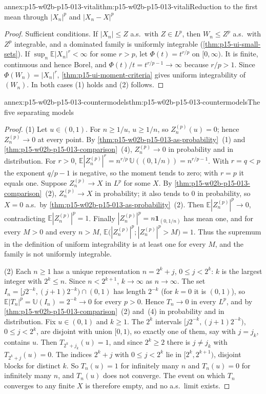\begin{annexitem}{annex:p15-w02b-p15-013-vitali}{thm:p15-w02b-p15-013-vitali}{Reduction to the first mean through \(|X_n|^p\) and \(|X_n-X|^p\)}
\begin{proof}
Sufficient conditions. If \(|X_n|\leq Z\) a.s.\ with \(Z\in L^p\),
then \(W_n\leq Z^p\) a.s.\ with \(Z^p\) integrable, and a dominated
family is uniformly integrable (\cref{thm:p15-ui-small-sets}). If
\(\sup_n\mathbb E|X_n|^r<\infty\) for some \(r>p\), let
\(\Phi(t)=t^{r/p}\) on \([0,\infty)\). It is finite, continuous and
hence Borel, and \(\Phi(t)/t=t^{r/p-1}\to\infty\) because \(r/p>1\).
Since \(\Phi(W_n)=|X_n|^r\), \cref{thm:p15-ui-moment-criteria} gives
uniform integrability of \((W_n)\). In both cases (1) holds and (2)
follows.
\end{proof}
\end{annexitem}

\begin{annexitem}{annex:p15-w02b-p15-013-countermodels}{thm:p15-w02b-p15-013-countermodels}{The five separating models}
\begin{proof}
(1) Let \(u\in(0,1)\). For \(n\geq1/u\), \(u\geq1/n\), so
\(Z^{(p)}_n(u)=0\); hence \(Z^{(p)}_n\to0\) at every point. By
\cref{thm:p15-w02b-p15-013-as-probability}~(1) and
\cref{thm:p15-w02b-p15-013-comparison}~(4), \(Z^{(p)}_n\to0\) in
probability and in distribution. For \(r>0\),
\(\mathbb E|Z^{(p)}_n|^r=n^{r/p}\,\mathbb U((0,1/n))=n^{r/p-1}\).
With \(r=q<p\) the exponent \(q/p-1\) is negative, so the moment tends
to zero; with \(r=p\) it equals one. Suppose \(Z^{(p)}_n\to X\) in
\(L^p\) for some \(X\). By
\cref{thm:p15-w02b-p15-013-comparison}~(2), \(Z^{(p)}_n\to X\) in
probability; it also tends to \(0\) in probability, so \(X=0\) a.s.\
by \cref{thm:p15-w02b-p15-013-as-probability}~(2). Then
\(\mathbb E|Z^{(p)}_n|^p\to0\), contradicting
\(\mathbb E|Z^{(p)}_n|^p=1\). Finally
\(|Z^{(p)}_n|^p=n\mathbf1_{(0,1/n)}\) has mean one, and for every
\(M>0\) and every \(n>M\),
\(\mathbb E\bigl(|Z^{(p)}_n|^p;|Z^{(p)}_n|^p>M\bigr)=1\). Thus the
supremum in the definition of uniform integrability is at least one
for every \(M\), and the family is not uniformly integrable.

(2) Each \(n\geq1\) has a unique representation \(n=2^k+j\),
\(0\leq j<2^k\): \(k\) is the largest integer with \(2^k\leq n\). Since
\(n<2^{k+1}\), \(k\to\infty\) as \(n\to\infty\). The set
\(I_n=[j2^{-k},(j+1)2^{-k})\cap(0,1)\) has length \(2^{-k}\) (for
\(k=0\) it is \((0,1)\)), so
\(\mathbb E|T_n|^p=\mathbb U(I_n)=2^{-k}\to0\) for every \(p>0\).
Hence \(T_n\to0\) in every \(L^p\), and by
\cref{thm:p15-w02b-p15-013-comparison}~(2) and~(4) in probability and
in distribution. Fix \(u\in(0,1)\) and \(k\geq1\). The \(2^k\) intervals
\([j2^{-k},(j+1)2^{-k})\), \(0\leq j<2^k\), are disjoint with union
\([0,1)\), so exactly one of them, say with \(j=j_k\), contains \(u\).
Then \(T_{2^k+j_k}(u)=1\), and since \(2^k\geq2\) there is
\(j\neq j_k\) with \(T_{2^k+j}(u)=0\). The indices \(2^k+j\) with
\(0\leq j<2^k\) lie in \([2^k,2^{k+1})\), disjoint blocks for distinct
\(k\). So \(T_n(u)=1\) for infinitely many \(n\) and \(T_n(u)=0\) for
infinitely many \(n\), and \(T_n(u)\) does not converge. The event on
which \(T_n\) converges to any finite \(X\) is therefore empty, and no
a.s.\ limit exists.


\end{proof}
\end{annexitem}
